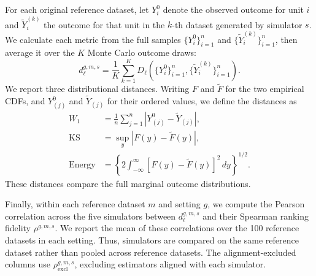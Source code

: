 For each original reference dataset, let \(Y_i^0\) denote the observed outcome for unit \(i\) and \(\widetilde Y_i^{(k)}\) the outcome for that unit in the \(k\)-th dataset generated by simulator \(s\). We calculate each metric from the full samples \(\{Y_i^0\}_{i=1}^n\) and \(\{\widetilde Y_i^{(k)}\}_{i=1}^n\), then average it over the \(K\) Monte Carlo outcome draws:
\[
d_\ell^{g,m,s}=\frac{1}{K}\sum_{k=1}^{K}D_\ell\!\left(\{Y_i^0\}_{i=1}^n,\{\widetilde Y_i^{(k)}\}_{i=1}^n\right).
\]
We report three distributional distances. Writing \(F\) and \(\widetilde F\) for the two empirical CDFs, and \(Y^0_{(j)}\) and \(\widetilde Y_{(j)}\) for their ordered values, we define the distances as
\[
\begin{aligned}
W_1&=\frac{1}{n}\sum_{j=1}^{n}\left|Y^0_{(j)}-\widetilde Y_{(j)}\right|,\\
\mathrm{KS}&=\sup_y\left|F(y)-\widetilde F(y)\right|,\\
\mathrm{Energy}&=\left\{2\int_{-\infty}^{\infty}\left[F(y)-\widetilde F(y)\right]^2\,dy\right\}^{1/2}.
\end{aligned}
\]
These distances compare the full marginal outcome distributions.

Finally, within each reference dataset \(m\) and setting \(g\), we compute the Pearson correlation across the five simulators between \(d_\ell^{g,m,s}\) and their Spearman ranking fidelity \(\rho^{g,m,s}\). We report the mean of these correlations over the 100 reference datasets in each setting. Thus, simulators are compared on the same reference dataset rather than pooled across reference datasets. The alignment-excluded columns use \(\rho_{\mathrm{excl}}^{g,m,s}\), excluding estimators aligned with each simulator.
